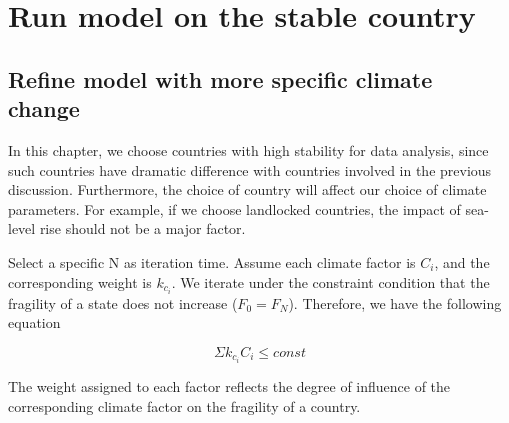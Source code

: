 \documentclass{mcmthesis}
\begin{document}
	\section{Run model on the stable country}
	\subsection{Refine model with more specific climate change}
	In this chapter, we choose countries with high stability for data analysis, since such countries have dramatic difference with countries involved in the previous discussion. Furthermore, the choice of country will affect our choice of climate parameters. For example, if we choose landlocked countries, the impact of sea-level rise should not be a major factor.
	
	Select a specific N as iteration time. Assume each climate factor is $C_i$, and the corresponding weight is $k_{c_i}$.  We iterate under the constraint condition that the fragility of a state does not increase ($F_0 = F_N$). Therefore, we have the following equation
	
	$$
	\Sigma k_{c_i} C_i \leq const
	$$
	
	The weight assigned to each factor reflects the degree of influence of the corresponding climate factor on the fragility of a country.
	
\end{document}
